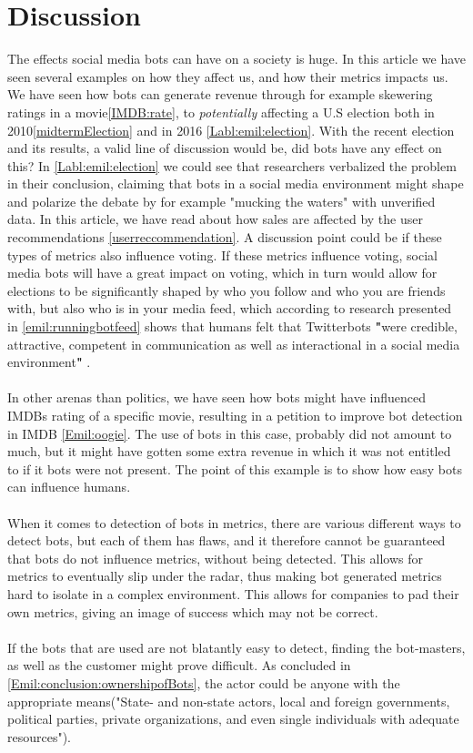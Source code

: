 \section{Discussion}
The effects social media bots can have on a society is huge. In this article we have seen several examples on how they affect us, and how their metrics impacts us. We have seen how bots can generate revenue through for example skewering ratings in a movie\ref{IMDB:rate}, to \textit{potentially} affecting a U.S election both in 2010\ref{midtermElection} and in 2016 \ref{Labl:emil:election}. With the recent election and its results, a valid line of discussion would be, did bots have any effect on this? In \ref{Labl:emil:election} we could see that researchers verbalized the problem in their conclusion, claiming that bots in a social media environment might shape and polarize the debate by for example "mucking the waters" with unverified data. In this article, we have read about how sales are affected by the user recommendations \ref{userreccommendation}. A discussion point could be if these types of metrics also influence voting. If these metrics influence voting, social media bots will have a great impact on voting, which in turn would allow for elections to be significantly shaped by who you follow and who you are friends with, but also who is in your media feed, which according to research presented in \ref{emil:runningbotfeed} shows that humans felt that Twitterbots \textbf{"}were credible, attractive, competent in communication as well as interactional in a social media environment\textbf{"} \cite{Edwards2014372}.
\\
\\
In other arenas than politics, we have seen how bots might have influenced IMDBs rating of a specific movie, resulting in a petition to improve bot detection in IMDB \ref{Emil:oogie}. The use of bots in this case, probably did not amount to much, but it might have gotten some extra revenue in which it was not entitled to if it bots were not present. The point of this example is to show how easy bots can influence humans. 
\\
\\
When it comes to detection of bots in metrics, there are various different ways to detect bots, but each of them has flaws, and it therefore cannot be guaranteed that bots do not influence metrics, without being detected. This allows for metrics to eventually slip under the radar, thus making bot generated metrics hard to isolate in a complex environment. This allows for companies to pad their own metrics, giving an image of success which may not be correct. 
\\
\\
If the bots that are used are not blatantly easy to detect, finding the bot-masters, as well as the customer might prove difficult. As concluded in \ref{Emil:conclusion:ownershipofBots}, the actor could be anyone with the appropriate means("State- and non-state actors, local and foreign governments, political parties, private organizations, and even single individuals with adequate resources").


